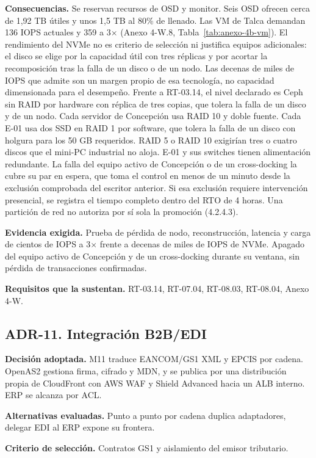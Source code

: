 \textbf{Consecuencias.} Se reservan recursos de OSD y monitor. Seis OSD ofrecen cerca de 1,92 TB útiles y unos 1,5 TB al 80\% de llenado. Las VM de Talca demandan 136 IOPS actuales y 359 a 3$\times$ (Anexo 4-W.8, Tabla~\ref{tab:anexo-4b-vm}). El rendimiento del NVMe no es criterio de selección ni justifica equipos adicionales: el disco se elige por la capacidad útil con tres réplicas y por acortar la recomposición tras la falla de un disco o de un nodo. Las decenas de miles de IOPS que admite son un margen propio de esa tecnología, no capacidad dimensionada para el desempeño. Frente a RT-03.14, el nivel declarado es Ceph sin RAID por hardware con réplica de tres copias, que tolera la falla de un disco y de un nodo. Cada servidor de Concepción usa RAID 10 y doble fuente. Cada E-01 usa dos SSD en RAID 1 por software, que tolera la falla de un disco con holgura para los 50 GB requeridos. RAID 5 o RAID 10 exigirían tres o cuatro discos que el mini-PC industrial no aloja. E-01 y sus switches tienen alimentación redundante. La falla del equipo activo de Concepción o de un cross-docking la cubre su par en espera, que toma el control en menos de un minuto desde la exclusión comprobada del escritor anterior. Si esa exclusión requiere intervención presencial, se registra el tiempo completo dentro del RTO de 4 horas. Una partición de red no autoriza por sí sola la promoción (4.2.4.3).

\textbf{Evidencia exigida.} Prueba de pérdida de nodo, reconstrucción, latencia y carga de cientos de IOPS a 3$\times$ frente a decenas de miles de IOPS de NVMe. Apagado del equipo activo de Concepción y de un cross-docking durante su ventana, sin pérdida de transacciones confirmadas.

\textbf{Requisitos que la sustentan.} RT-03.14, RT-07.04, RT-08.03, RT-08.04, Anexo 4-W.

\subsection*{ADR-11. Integración B2B/EDI}
\label{sub:adr-11}
\textbf{Decisión adoptada.} M11 traduce EANCOM/GS1 XML y EPCIS por cadena. OpenAS2 gestiona firma, cifrado y MDN, y se publica por una distribución propia de CloudFront con AWS WAF y Shield Advanced hacia un ALB interno. ERP se alcanza por ACL.

\textbf{Alternativas evaluadas.} Punto a punto por cadena duplica adaptadores, delegar EDI al ERP expone su frontera.

\textbf{Criterio de selección.} Contratos GS1 y aislamiento del emisor tributario.

